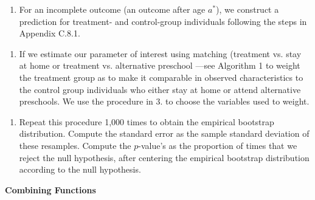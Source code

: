 \documentclass[static]{JJH-Beamer}
\begin{document}
\begin{frame}
 \addtocounter{framenumber}{-1}

\begin{enumerate}[5.]
\item For an incomplete outcome (an outcome after age $a^*$), we construct a prediction for treatment- and control-group individuals following the steps in Appendix C.8.1.
\end{enumerate}

\end{frame}

\begin{frame}
 \addtocounter{framenumber}{-1}

\begin{enumerate}[6.]
\item If we estimate our parameter of interest using  matching (treatment vs. stay at home or treatment vs. alternative preschool ---see Algorithm 1 to weight the treatment group as to make it comparable in observed characteristics to the control group individuals who either stay at home or attend alternative preschools. We use the procedure in 3. to choose the variables used to weight.
\end{enumerate}

\end{frame}

\begin{frame}
 \addtocounter{framenumber}{-1}

\begin{enumerate}[7.]
\item Repeat this procedure 1,000 times to obtain the empirical bootstrap distribution. Compute the standard error as the sample standard deviation of these resamples. Compute the $p$-value's as the proportion of times that we reject the null hypothesis, after centering the empirical bootstrap distribution according to the null hypothesis.
\end{enumerate}

\end{frame}

\clearpage

\begin{frame}
 \addtocounter{framenumber}{-1}

\begin{center}
\textbf{Combining Functions}
\end{center}

\end{frame}
\end{document}
